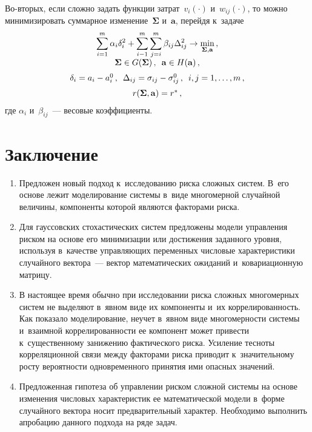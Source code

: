 \begin{multicols}{2}
  
  Во-вторых, если сложно задать функции за\-трат~$v_i(\cdot)$ 
и~$w_{ij}(\cdot)$, то мож\-но минимизировать суммарное 
изменение~$\boldsymbol{\Sigma}$ и~$\mathbf{a}$, перейдя к~задаче
  \begin{equation*}
  \begin{array}{c}
  \displaystyle \sum\limits_{i=1}^m \alpha_i \delta_i^2 +\sum\limits^m_{i-1} 
\sum\limits^m_{j=i} \beta_{ij} \Delta_{ij}^2 \to 
\min\limits_{\boldsymbol{\Sigma}, \mathbf{a}}\,,\\[6pt]
 \boldsymbol{\Sigma} \in G(\boldsymbol{\Sigma})\,,\enskip \mathbf{a}\in 
H(\mathbf{a})\,,\\[6pt]
  \delta_i =a_i-a_i^0\,,\enskip \Delta_{ij}=\sigma_{ij}-\sigma_{ij}^0\,,\enskip 
i,j=1,\ldots ,m\,,\\[6pt]
  r(\boldsymbol{\Sigma}, \mathbf{a}) =r^*\,,
  \end{array}
  \end{equation*}
где $\alpha_i$ и~$\beta_{ij}$~--- весовые коэффициенты.

\section{Заключение}

\noindent
  \begin{enumerate}[1.]
  \item  Предложен новый подход к~исследованию рис\-ка сложных сис\-тем. 
В~его основе лежит моделирование сис\-те\-мы в~виде мно\-го\-мер\-ной случайной 
величины, компоненты которой являются факторами риска.
  \item  Для гауссовских стохастических сис\-тем предложены модели 
управления рис\-ком на основе его минимизации или до\-сти\-же\-ния заданного 
уров\-ня, используя в~качестве управ\-ля\-ющих переменных чис\-ло\-вые 
характеристики случайного век\-то\-ра~--- вектор математических ожиданий 
и~ковариационную мат\-рицу.
  \item  В настоящее время обычно при исследовании риска слож\-ных 
многомерных сис\-тем не выделяют в~явном виде их компоненты и~их 
коррелированность. Как показало моделирование, неучет в~явном виде 
многомерности сис\-те\-мы и~взаимной коррелированности ее компонент может 
привести к~существенному занижению фактического рис\-ка. Усиление тес\-но\-ты 
корреляционной связи между факторами риска приводит к~значительному 
рос\-ту ве\-ро\-ят\-ности одновременного принятия ими опас\-ных значений.
  \item Предложенная гипотеза об управ\-ле\-нии рис\-ком слож\-ной сис\-те\-мы на 
основе изменения чис\-ло\-вых характеристик ее математической модели в~форме 
случайного век\-то\-ра носит предварительный характер. Необходимо выполнить 
апро\-ба\-цию данного подхода на ряде задач.
  \end{enumerate}
  \vspace*{-8pt}
  

\end{multicols}
